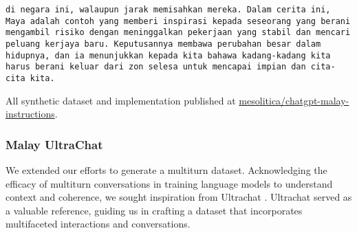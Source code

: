\documentclass{article}
\begin{document}
\begin{lstlisting}[breaklines=true]
di negara ini, walaupun jarak memisahkan mereka. Dalam cerita ini, Maya adalah contoh yang memberi inspirasi kepada seseorang yang berani mengambil risiko dengan meninggalkan pekerjaan yang stabil dan mencari peluang kerjaya baru. Keputusannya membawa perubahan besar dalam hidupnya, dan ia menunjukkan kepada kita bahawa kadang-kadang kita harus berani keluar dari zon selesa untuk mencapai impian dan cita-cita kita.
\end{lstlisting}

All synthetic dataset and implementation published at \href{https://huggingface.co/datasets/mesolitica/chatgpt-malay-instructions}{mesolitica/chatgpt-malay-instructions}.

\subsubsection{Malay UltraChat}

We extended our efforts to generate a multiturn dataset. Acknowledging the efficacy of multiturn conversations in training language models to understand context and coherence, we sought inspiration from Ultrachat \cite{ding2023enhancing}. Ultrachat served as a valuable reference, guiding us in crafting a dataset that incorporates multifaceted interactions and conversations.
\end{document}
